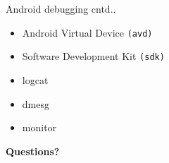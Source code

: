\documentclass{beamer}
\begin{document}
 \begin{frame}{Android debugging cntd..}
   \begin{block}{}
     \begin{itemize}
       \item Android Virtual Device {\tt (avd)}
       \item Software Development Kit {\tt (sdk)}
       \item logcat
       \item dmesg
       \item monitor
     \end{itemize}
   \end{block}
 \end{frame}

\begin{frame}{}
  \centerline{\bf Questions?}
\end{frame}
\end{document}
